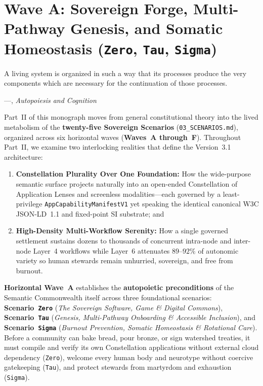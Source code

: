 \chapter{Wave A: Sovereign Forge, Multi-Pathway Genesis, and Somatic Homeostasis (\texttt{Zero}, \texttt{Tau}, \texttt{Sigma})}
\label{ch:wave-a}

\epigraph{A living system is organized in such a way that its processes produce the very components which are necessary for the continuation of those processes.}{---\textcite{maturana1980}, \textit{Autopoiesis and Cognition}}

Part~II of this monograph moves from general constitutional theory into the lived metabolism of the \textbf{twenty-five Sovereign Scenarios} (\texttt{03\_SCENARIOS.md}), organized across six horizontal waves (\textbf{Waves~A through~F}). Throughout Part~II, we examine two interlocking realities that define the Version~3.1 architecture:
\begin{enumerate}
    \item \textbf{Constellation Plurality Over One Foundation:} How the wide-purpose semantic surface projects naturally into an open-ended Constellation of Application Lenses and screenless modalities---each governed by a least-privilege \texttt{AppCapabilityManifestV1} yet speaking the identical canonical W3C JSON-LD~1.1 and fixed-point SI substrate; and
    \item \textbf{High-Density Multi-Workflow Serenity:} How a single governed settlement sustains dozens to thousands of concurrent intra-node and inter-node Layer~4 workflows while Layer~6 attenuates $89\text{--}92\%$ of autonomic variety so human stewards remain unhurried, sovereign, and free from burnout.
\end{enumerate}

\textbf{Horizontal Wave~A} establishes the \textbf{autopoietic preconditions} of the Semantic Commonwealth itself across three foundational scenarios: \textbf{Scenario~\texttt{Zero}} (\textit{The Sovereign Software, Game \& Digital Commons}), \textbf{Scenario~\texttt{Tau}} (\textit{Genesis, Multi-Pathway Onboarding \& Accessible Inclusion}), and \textbf{Scenario~\texttt{Sigma}} (\textit{Burnout Prevention, Somatic Homeostasis \& Rotational Care}). Before a community can bake bread, pour bronze, or sign watershed treaties, it must compile and verify its own Constellation applications without external cloud dependency (\texttt{Zero}), welcome every human body and neurotype without coercive gatekeeping (\texttt{Tau}), and protect stewards from martyrdom and exhaustion (\texttt{Sigma}).

